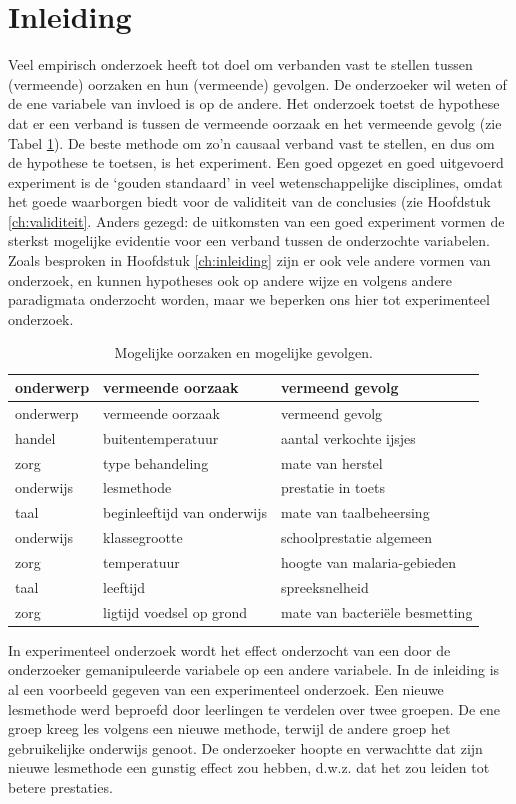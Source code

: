 \documentclass[
]{book}
\begin{document}
\hypertarget{inleiding}{%
\section{Inleiding}\label{inleiding}}

Veel empirisch onderzoek heeft tot doel om verbanden vast te stellen
tussen (vermeende) oorzaken en hun (vermeende) gevolgen. De onderzoeker
wil weten of de ene variabele van invloed is op de andere. Het onderzoek
toetst de hypothese dat er een verband is tussen de vermeende oorzaak en
het vermeende gevolg (zie Tabel \ref{tab:oorzaakgevolg}).
De beste methode om zo'n causaal verband vast
te stellen, en dus om de hypothese te toetsen, is het experiment. Een
goed opgezet en goed uitgevoerd experiment is de `gouden standaard' in
veel wetenschappelijke disciplines, omdat het goede waarborgen biedt
voor de validiteit van de conclusies (zie
Hoofdstuk \ref{ch:validiteit}.
Anders gezegd: de uitkomsten van een goed
experiment vormen de sterkst mogelijke evidentie voor een verband tussen
de onderzochte variabelen. Zoals besproken in
Hoofdstuk \ref{ch:inleiding} zijn er ook vele andere vormen van onderzoek,
en kunnen hypotheses ook op andere wijze en volgens andere paradigmata
onderzocht worden, maar we beperken ons hier tot experimenteel
onderzoek.

\begin{longtable}[]{@{}lll@{}}
\caption{\label{tab:oorzaakgevolg} Mogelijke oorzaken en mogelijke gevolgen.}\tabularnewline
\toprule
onderwerp & vermeende oorzaak & vermeend gevolg\tabularnewline
\midrule
\endfirsthead
\toprule
onderwerp & vermeende oorzaak & vermeend gevolg\tabularnewline
\midrule
\endhead
handel & buitentemperatuur & aantal verkochte ijsjes\tabularnewline
zorg & type behandeling & mate van herstel\tabularnewline
onderwijs & lesmethode & prestatie in toets\tabularnewline
taal & beginleeftijd van onderwijs & mate van taalbeheersing\tabularnewline
onderwijs & klassegrootte & schoolprestatie algemeen\tabularnewline
zorg & temperatuur & hoogte van malaria-gebieden\tabularnewline
taal & leeftijd & spreeksnelheid\tabularnewline
zorg & ligtijd voedsel op grond & mate van bacteriële besmetting\tabularnewline
\bottomrule
\end{longtable}

In experimenteel onderzoek wordt het effect onderzocht van een door de
onderzoeker gemanipuleerde variabele op een andere variabele. In de
inleiding is al een voorbeeld gegeven van een experimenteel onderzoek.
Een nieuwe lesmethode werd beproefd door leerlingen te verdelen over
twee groepen. De ene groep kreeg les volgens een nieuwe methode, terwijl
de andere groep het gebruikelijke onderwijs genoot. De onderzoeker
hoopte en verwachtte dat zijn nieuwe lesmethode een gunstig effect zou
hebben, d.w.z. dat het zou leiden tot betere prestaties.
\end{document}
